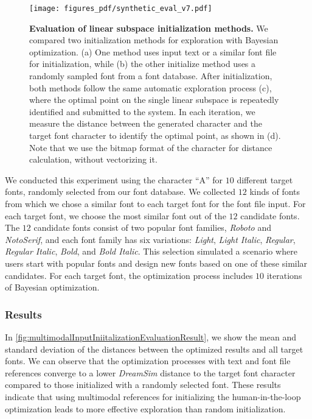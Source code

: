 \begin{figure}[ht]
    \centering
    \texttt{[image: figures\_pdf/synthetic\_eval\_v7.pdf]}
    \caption{
    \textbf{Evaluation of linear subspace initialization methods.}
    We compared two initialization methods for exploration with Bayesian optimization.
    (a) One method uses input text or a similar font file for initialization, while (b) the other initialize method uses a randomly sampled font from a font database.
    After initialization, both methods follow the same automatic exploration process (c), where the optimal point on the single linear subspace is repeatedly identified and submitted to the system.
    In each iteration, we measure the distance between the generated character and the target font character to identify the optimal point, as shown in (d).
    Note that we use the bitmap format of the character for distance calculation, without vectorizing it.
    }
    \label{fig:multimodalInputIniitalizationEvaluation}
\end{figure}
We conducted this experiment using the character ``A'' for $10$ different target fonts, randomly selected from our font database.
We collected $12$ kinds of fonts from which we chose a similar font to each target font for the font file input.
For each target font, we choose the most similar font out of the $12$ candidate fonts.
The $12$ candidate fonts consist of two popular font families, \textit{Roboto} and \textit{NotoSerif}, and each font family has six variations: \textit{Light}, \textit{Light Italic}, \textit{Regular}, \textit{Regular Italic}, \textit{Bold}, and \textit{Bold Italic}.
This selection simulated a scenario where users start with popular fonts and design new fonts based on one of these similar candidates.
For each target font, the optimization process includes $10$ iterations of Bayesian optimization.

\subsubsection{Results}
In \autoref{fig:multimodalInputIniitalizationEvaluationResult}, we show the mean and standard deviation of the distances between the optimized results and all target fonts.
We can observe that the optimization processes with text and font file references converge to a lower \textit{DreamSim} distance to the target font character compared to those initialized with a randomly selected font.
These results indicate that using multimodal references for initializing the human-in-the-loop optimization leads to more effective exploration than random initialization.


